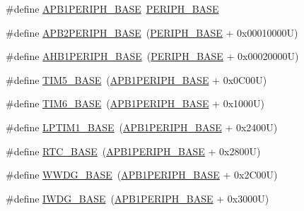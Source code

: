 \begin{DoxyCompactItemize}
\#define \hyperlink{group___peripheral__registers__structures_ga45666d911f39addd4c8c0a0ac3388cfb}{A\+P\+B1\+P\+E\+R\+I\+P\+H\+\_\+\+B\+A\+SE}~\hyperlink{group___peripheral__memory__map_ga9171f49478fa86d932f89e78e73b88b0}{P\+E\+R\+I\+P\+H\+\_\+\+B\+A\+SE}
\item 
\#define \hyperlink{group___peripheral__registers__structures_ga25b99d6065f1c8f751e78f43ade652cb}{A\+P\+B2\+P\+E\+R\+I\+P\+H\+\_\+\+B\+A\+SE}~(\hyperlink{group___peripheral__memory__map_ga9171f49478fa86d932f89e78e73b88b0}{P\+E\+R\+I\+P\+H\+\_\+\+B\+A\+SE} + 0x00010000\+U)
\item 
\#define \hyperlink{group___peripheral__registers__structures_ga811a9a4ca17f0a50354a9169541d56c4}{A\+H\+B1\+P\+E\+R\+I\+P\+H\+\_\+\+B\+A\+SE}~(\hyperlink{group___peripheral__memory__map_ga9171f49478fa86d932f89e78e73b88b0}{P\+E\+R\+I\+P\+H\+\_\+\+B\+A\+SE} + 0x00020000\+U)
\item 
\#define \hyperlink{group___peripheral__registers__structures_ga3e1671477190d065ba7c944558336d7e}{T\+I\+M5\+\_\+\+B\+A\+SE}~(\hyperlink{group___peripheral__memory__map_ga45666d911f39addd4c8c0a0ac3388cfb}{A\+P\+B1\+P\+E\+R\+I\+P\+H\+\_\+\+B\+A\+SE} + 0x0\+C00\+U)
\item 
\#define \hyperlink{group___peripheral__registers__structures_ga8268ec947929f192559f28c6bf7d1eac}{T\+I\+M6\+\_\+\+B\+A\+SE}~(\hyperlink{group___peripheral__memory__map_ga45666d911f39addd4c8c0a0ac3388cfb}{A\+P\+B1\+P\+E\+R\+I\+P\+H\+\_\+\+B\+A\+SE} + 0x1000\+U)
\item 
\#define \hyperlink{group___peripheral__registers__structures_ga012ceb003fbb615eedb39a8d7f31c9c6}{L\+P\+T\+I\+M1\+\_\+\+B\+A\+SE}~(\hyperlink{group___peripheral__memory__map_ga45666d911f39addd4c8c0a0ac3388cfb}{A\+P\+B1\+P\+E\+R\+I\+P\+H\+\_\+\+B\+A\+SE} + 0x2400\+U)
\item 
\#define \hyperlink{group___peripheral__registers__structures_ga4265e665d56225412e57a61d87417022}{R\+T\+C\+\_\+\+B\+A\+SE}~(\hyperlink{group___peripheral__memory__map_ga45666d911f39addd4c8c0a0ac3388cfb}{A\+P\+B1\+P\+E\+R\+I\+P\+H\+\_\+\+B\+A\+SE} + 0x2800\+U)
\item 
\#define \hyperlink{group___peripheral__registers__structures_ga9a5bf4728ab93dea5b569f5b972cbe62}{W\+W\+D\+G\+\_\+\+B\+A\+SE}~(\hyperlink{group___peripheral__memory__map_ga45666d911f39addd4c8c0a0ac3388cfb}{A\+P\+B1\+P\+E\+R\+I\+P\+H\+\_\+\+B\+A\+SE} + 0x2\+C00\+U)
\item 
\#define \hyperlink{group___peripheral__registers__structures_ga8543ee4997296af5536b007cd4748f55}{I\+W\+D\+G\+\_\+\+B\+A\+SE}~(\hyperlink{group___peripheral__memory__map_ga45666d911f39addd4c8c0a0ac3388cfb}{A\+P\+B1\+P\+E\+R\+I\+P\+H\+\_\+\+B\+A\+SE} + 0x3000\+U)

\end{DoxyCompactItemize}
